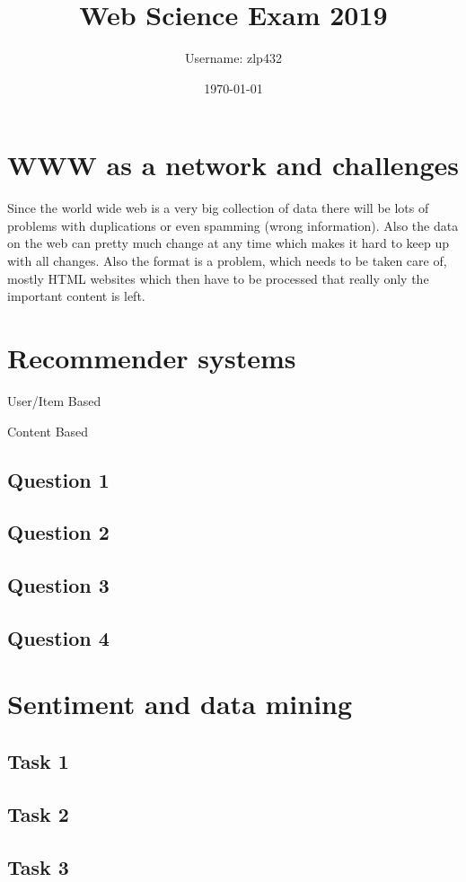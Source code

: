 \documentclass[11pt,a4paper]{article}
\begin{document}
\title{Web Science Exam 2019}

\author{Username: zlp432}
\date{\today}
	
\maketitle
\tableofcontents

\section{WWW as a network and challenges}

Since the world wide web is a very big collection of data there will be lots of problems with duplications or even spamming (wrong information).
Also the data on the web can pretty much change at any time which makes it hard to keep up with all changes.
Also the format is a problem, which needs to be taken care of, mostly HTML websites which then have to be processed that really only the important content is left.


\section{Recommender systems}
User/Item Based

Content Based

\subsection{Question 1}

\subsection{Question 2}

\subsection{Question 3}

\subsection{Question 4}

\section{Sentiment and data mining}

\subsection{Task 1}

\subsection{Task 2}

\subsection{Task 3}
\end{document}
